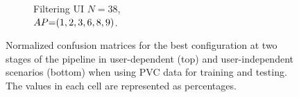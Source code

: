 \begin{figure}[ht]
\begin{subfigure}{.49\textwidth}
    \vspace{-15pt}
    \captionsetup{width=.99\linewidth}
    \caption{Filtering UI $N{=}38$, \\ $\splitatcommas{AP{=}(1, 2, 3, 6, 8, 9)}$.}
    \label{fig:radar-experiments:through-materials:pvc-confusion:filtering-ui}
  \end{subfigure}

  \vspace{-6pt}
    \caption{Normalized confusion matrices for the best configuration at two stages of the pipeline in user-dependent (top) and user-independent scenarios (bottom) when using PVC data for training and testing. The values in each cell are represented as percentages.}
    \label{fig:radar-experiments:through-materials:pvc-confusion}
\end{figure}



